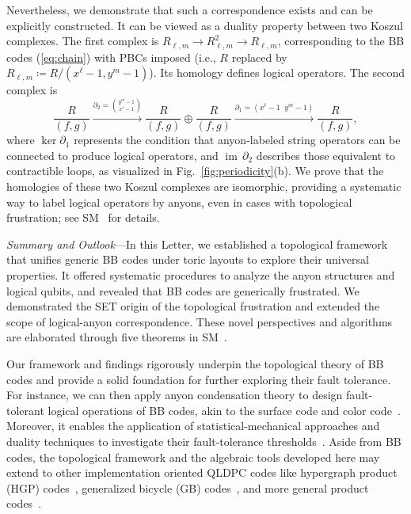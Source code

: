 \documentclass[aps,prl,english,superscriptaddress,twocolumn,tightenlines,showpacs,longbibliography,floatfix,amsfonts]{revtex4-2}
\newcommand{\im}[1]{{\operatorname{im} \, #1}}
\begin{document}
	Nevertheless, we demonstrate that such a correspondence exists and can be explicitly constructed. It can be viewed as a duality property between two Koszul complexes.
	The first complex is $R_{\ell, m} \longrightarrow R_{\ell, m}^2 \longrightarrow R_{\ell, m}$, corresponding to the BB codes  (\ref{eq:chain})
	with PBCs imposed (i.e., $R$ replaced by $R_{\ell, m}\coloneqq R/(x^{\ell}-1,y^{m}-1)$). 
	Its homology defines logical operators.
	The second complex is 
	\begin{equation}\label{eq:koszul}
		\frac{R}{\left(f,g\right)}\xrightarrow{\partial_{2}={y^{m}-1 \choose x^{\ell}-1}}\frac{R}{\left(f,g\right)}\oplus\frac{R}{\left(f,g\right)}\xrightarrow{\partial_{1}=\left(x^{\ell}-1\;\;y^{m}-1\right)}\frac{R}{\left(f,g\right)},
	\end{equation}
	where $\ker \partial_1$ represents the condition that anyon-labeled string operators can be connected to produce logical operators, and $\im{\partial_2}$ describes those equivalent to contractible loops, as visualized in  Fig.~\ref{fig:periodicity}(b). 
	We prove that the homologies of these two Koszul complexes are isomorphic, providing a systematic way to label logical operators by anyons, even in cases with topological frustration; see SM~\cite{SM1} for details.
	
	
	\emph{Summary and Outlook}---In this Letter, we established a topological framework that unifies generic BB codes under toric layouts to explore their universal properties.
	It offered systematic procedures to analyze the anyon structures and logical qubits, and revealed that BB codes are generically frustrated.
	We demonstrated the SET origin of the topological frustration and extended the scope of logical-anyon correspondence. These novel perspectives and algorithms are elaborated through five theorems in SM~\cite{SM1}.
	
	Our framework and findings rigorously underpin the topological theory of BB codes and provide a solid foundation for further exploring their fault tolerance.
	For instance, we can then apply anyon condensation theory to design fault-tolerant logical operations of BB codes, akin to the surface code and color code~\cite{Bombin09,Krishna21,Kesselring24}.
	Moreover, it enables the application of statistical-mechanical approaches and duality techniques to investigate their fault-tolerance thresholds~\cite{Dennis02,Wang03,Chubb21,Song22,Nishimori07}.
	Aside from BB codes, the topological framework and the algebraic tools developed here may extend to other implementation oriented QLDPC codes like hypergraph product (HGP) codes~\cite{Tillich14}, generalized bicycle (GB) codes~\cite{Kovalev13}, and more general product codes~\cite{Breuckmann21a,Rakovszky24}.
	
\end{document}
